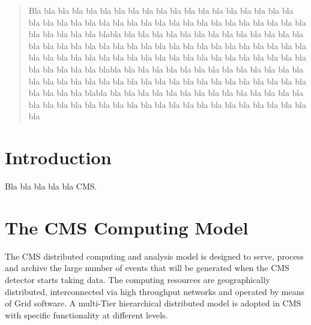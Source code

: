 \date{Received: date / Accepted: date}


\maketitle

\begin{abstract}
Bla bla bla bla bla bla bla bla bla bla bla bla bla bla bla bla bla bla bla bla bla bla bla bla bla bla bla bla bla bla bla bla bla bla bla bla bla bla bla bla bla bla bla bla blabla bla bla bla bla bla bla bla bla bla bla bla bla bla bla bla bla bla bla bla bla bla bla bla bla bla bla bla bla bla bla bla bla bla bla bla bla bla bla bla bla bla bla bla bla bla bla bla bla bla bla bla bla bla bla bla bla bla bla blabla bla bla bla bla bla bla bla bla bla bla bla bla bla bla bla bla bla bla bla bla bla bla bla bla bla bla bla bla bla bla bla bla bla bla bla bla bla blabla bla bla bla bla bla bla bla bla bla bla bla bla bla bla bla bla bla bla bla bla bla bla bla bla bla bla bla bla bla bla bla bla bla bla bla
\end{abstract}

\section{Introduction}
\label{intro}
Bla bla bla bla bla CMS\cite{RefCMS}.
\section{The CMS Computing Model}
\label{sec:2}
The CMS distributed computing and analysis model is designed to serve, process and archive the %
large number of events that will be generated when the CMS detector starts taking data. The computing resources are geographically distributed, interconnected via high throughput networks and operated by means of Grid software. 
A multi-Tier hierarchical distributed model is adopted in CMS with specific functionality at different levels.
